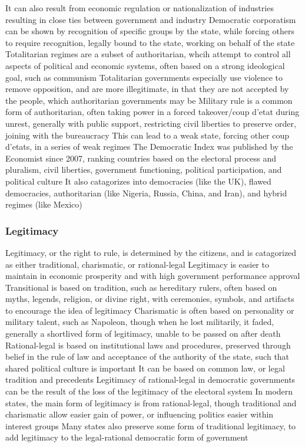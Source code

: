 \documentclass[11 pt, twoside]{article}
\newenvironment{outline*}
{
	\begin{outline}[enumerate]
	}
	{\end{outline}
}
\begin{document}
\begin{outline*}
\3 It can also result from economic regulation or nationalization of industries resulting in close ties between government and industry
\3 Democratic corporatism can be shown by recognition of specific groups by the state, while forcing others to require recognition, legally bound to the state, working on behalf of the state
\2 Totalitarian regimes are a subset of authoritarian, whcih attempt to control all aspects of political and economic systems, often based on a strong ideological goal, such as communism
\3 Totalitarian governments especially use violence to remove opposition, and are more illegitimate, in that they are not accepted by the people, which authoritarian governments may be
\2 Military rule is a common form of authoritarian, often taking power in a forced takeover/coup d'etat during unrest, generally with public support, restricting civil liberties to preserve order, joining with the bureaucracy
\3 This can lead to a weak state, forcing other coup d'etats, in a series of weak regimes
\1 The Democratic Index was published by the Economist since 2007, ranking countries based on the electoral process and pluralism, civil liberties, government functioning, political participation, and political culture
\2 It also catagorizes into democracies (like the UK), flawed democracies, authoritarian (like Nigeria, Russia, China, and Iran), and hybrid regimes (like Mexico)
\end{outline*}

\subsubsection{Legitimacy}
\begin{outline*}
\1 Legitimacy, or the right to rule, is determined by the citizens, and is catagorized as either traditional, charismatic, or rational-legal
\2 Legitimacy is easier to maintain in economic prosperity and with high government performance approval
\1 Transitional is based on tradition, such as hereditary rulers, often based on myths, legends, religion, or divine right, with ceremonies, symbols, and artifacts to encourage the idea of legitimacy
\1 Charismatic is often based on personality or military talent, such as Napoleon, though when he lost militarily, it faded, generally a shortlived form of legitimacy, unable to be passed on after death
\1 Rational-legal is based on institutional laws and procedures, preserved through belief in the rule of law and acceptance of the authority of the state, such that shared political culture is important
\2 It can be based on common law, or legal tradition and precedents
\2 Legitimacy of rational-legal in democratic governments can be the result of the loss of the legitimacy of the electoral system
\1 In modern states, the main form of legitimacy is from rational-legal, though traditional and charismatic allow easier gain of power, or influencing politics easier within interest groups
\2 Many states also preserve some form of traditional legitimacy, to add legitimacy to the legal-rational democratic form of government
\end{outline*}
\end{document}

